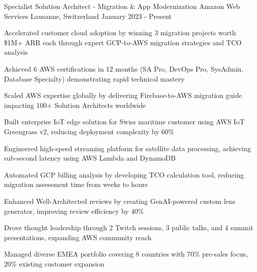 \clearpage



\begin{cventries}
    \cventry
    {Specialist Solution Architect - Migration \& App Modernization} %
    {Amazon Web Services} %
    {Lausanne, Switzerland} %
    {January 2023 - Present} %
    {
        \begin{cvitems} %
		\item {Accelerated customer cloud adoption by winning 3 migration projects worth \$1M+ ARR each through expert GCP-to-AWS migration strategies and TCO analysis}
		\item {Achieved 6 AWS certifications in 12 months (SA Pro, DevOps Pro, SysAdmin, Database Specialty) demonstrating rapid technical mastery}
		\item {Scaled AWS expertise globally by delivering Firebase-to-AWS migration guide impacting 100+ Solution Architects worldwide}
		\item {Built enterprise IoT edge solution for Swiss maritime customer using AWS IoT Greengrass v2, reducing deployment complexity by 60\%}
		\item {Engineered high-speed streaming platform for satellite data processing, achieving sub-second latency using AWS Lambda and DynamoDB}
		\item {Automated GCP billing analysis by developing TCO calculation tool, reducing migration assessment time from weeks to hours}
		\item {Enhanced Well-Architected reviews by creating GenAI-powered custom lens generator, improving review efficiency by 40\%}
		\item {Drove thought leadership through 2 Twitch sessions, 3 public talks, and 4 summit presentations, expanding AWS community reach}
        \item {Managed diverse EMEA portfolio covering 8 countries with 70\% pre-sales focus, 20\% existing customer expansion}
        \end{cvitems}
    }%

\end{cventries}
